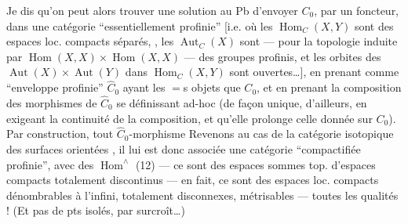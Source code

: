 Je dis qu'on peut alors trouver une
solution au Pb d'envoyer $C_0$, par un foncteur,
dans une catégorie  ``essentiellement profinie''
[i.e. où les $\operatorname{Hom}_C(X,Y)$ sont des espaces loc. compacts
séparés, , les $\operatorname{Aut}_C(X)$ sont --- pour la topologie
induite par $\operatorname{Hom}(X,X)\times\operatorname{Hom}(X,X)$ --- des
groupes profinis, et les orbites des $\operatorname{Aut}(X)\times\operatorname{Aut}(Y)$
dans $\operatorname{Hom}_C(X,Y)$ sont ouvertes\ldots], en prenant
comme ``enveloppe profinie'' $\widehat C_0$  ayant les
$=$s  objets que $C_0$, et en prenant
la composition des morphismes de $\widehat C_0$ se
définissant ad-hoc (de façon unique, d'ailleurs,
en exigeant la continuité de la composition, et
qu'elle prolonge celle donnée sur $C_0$).
Par construction, tout $\widehat C_0$-morphisme
Revenons au cas de la catégorie isotopique
des surfaces orientées  , il lui est donc
associée une catégorie ``compactifiée profinie'',
avec des $\operatorname{Hom}^{\wedge}$  (12) --- ce sont
des espaces sommes top. d'espaces compacts
totalement discontinus --- en fait, ce sont
des espaces loc. compacts dénombrables à l'infini,
totalement disconnexes, métrisables --- toutes
les qualités ! (Et pas de pts isolés, par
surcroît\ldots)

